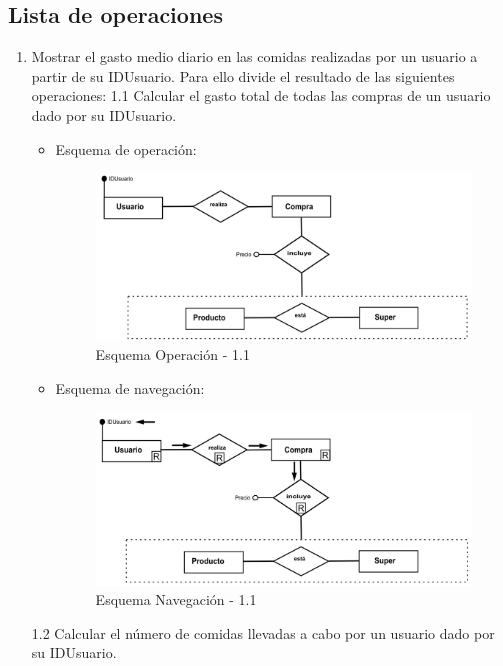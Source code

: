 \documentclass[a4paper,12pt]{report}
\begin{document}
\subsection{Lista de operaciones}
\label{sec-7-6-1}
\begin{enumerate}
\item Mostrar el gasto medio diario en las comidas realizadas por un
usuario a partir de su IDUsuario. Para ello divide el resultado de las siguientes operaciones:
1.1 Calcular el gasto total de todas las compras de un usuario dado por su IDUsuario.
\begin{itemize}
\item Esquema de operación:
\begin{figure}[!htp]
\centering
\includegraphics[width=0.9\linewidth]{./operaciones/img/Estadisticas/11_ope.png}
\caption{Esquema Operación - 1.1}
\label{fig:ope11}
\medskip
\footnotesize
{}
\end{figure}
\item Esquema de navegación:
\begin{figure}[!htp]
\centering
\includegraphics[width=0.9\linewidth]{./operaciones/img/Estadisticas/11_nav.png}
\caption{Esquema Navegación - 1.1}
\label{fig:nave11}
\medskip
\footnotesize
{}
\end{figure}
\end{itemize}
1.2 Calcular el número de comidas llevadas a cabo por un usuario dado por su IDUsuario.
\begin{itemize}

\end{itemize}
\end{enumerate}
\end{document}
